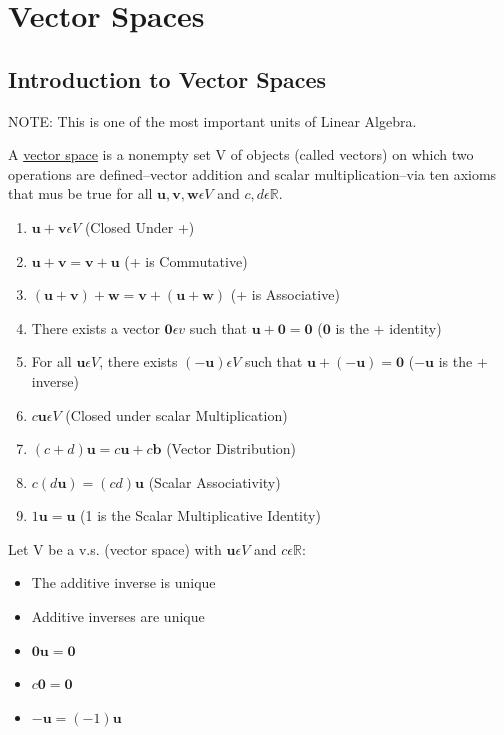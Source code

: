 \documentclass{report}
\begin{document}
\chapter{Vector Spaces}

\section{Introduction to Vector Spaces}
NOTE: This is one of the most important units of Linear Algebra.
\begin{definition}
	A \underline{vector space} is a nonempty set V of objects (called vectors) on which two operations are defined--vector addition and scalar multiplication--via ten axioms that mus be true for all $\mathbf{u},\mathbf{v},\mathbf{w}\epsilon V$ and $c,d\epsilon \mathbb{R}$.
	\begin{enumerate}
		\item $\mathbf{u}+\mathbf{v}\epsilon V$  (Closed Under +)
		\item $\mathbf{u}+\mathbf{v} = \mathbf{v}+\mathbf{u}$  (+ is Commutative)
		\item $(\mathbf{u}+\mathbf{v})+\mathbf{w} = \mathbf{v}+(\mathbf{u}+\mathbf{w})$  (+ is Associative)
		\item There exists a vector $\mathbf{0}\epsilon v$ such that $\mathbf{u} + \mathbf{0} = \mathbf{0}$  ($\mathbf{0}$ is the + identity)
		\item For all $\mathbf{u}\epsilon V$, there exists $(-\mathbf{u})\epsilon V$ such that $\mathbf{u}+(-\mathbf{u}) = \mathbf{0}$  ($-\mathbf{u}$ is the + inverse)
		\item $c\mathbf{u}\epsilon V$  (Closed under scalar Multiplication)
		\item $(c+d)\mathbf{u}=c\mathbf{u}+c\mathbf{b}$  (Vector Distribution)
		\item $c(d\mathbf{u}) = (cd)\mathbf{u}$  (Scalar Associativity)
		\item $1\mathbf{u}=\mathbf{u}$  (1 is the Scalar Multiplicative Identity)
	\end{enumerate}
\end{definition}
\begin{proposition}
	Let V be a v.s. (vector space) with $\mathbf{u}\epsilon V$ and $c\epsilon \mathbb{R}$:
	\begin{itemize}
		\item The additive inverse is unique
		\item Additive inverses are unique
		\item $\mathbf{0}\mathbf{u}=\mathbf{0}$
		\item $c\mathbf{0}=\mathbf{0}$
		\item $-\mathbf{u}=(-1)\mathbf{u}$
	\end{itemize}
\end{proposition}
\end{document}
